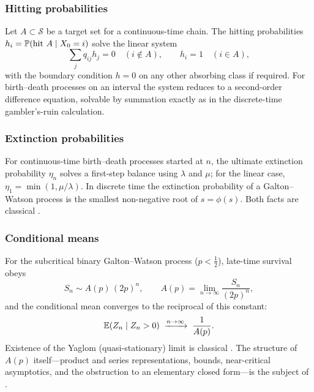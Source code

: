 \subsubsection*{Hitting probabilities}

Let $A\subset\mathcal S$ be a target set for a continuous-time chain. The hitting
probabilities $h_i=\mathbb{P}\!\left(\text{hit }A\mid X_0=i\right)$ solve the linear system
\begin{equation}
\label{m:eq:hitting}
\sum_j q_{ij}h_j = 0\quad(i\notin A),
\qquad h_i=1\quad(i\in A),
\end{equation}
with the boundary condition $h=0$ on any other absorbing class if required. For
birth--death processes on an interval the system reduces to a second-order difference
equation, solvable by summation exactly as in the discrete-time gambler's-ruin
calculation.

\subsubsection*{Extinction probabilities}

For continuous-time birth--death processes started at $n$, the ultimate extinction
probability $\eta_n$ solves a first-step balance using $\lambda$ and $\mu$; for the
linear case, $\eta_1=\min(1,\mu/\lambda)$. In discrete time the extinction probability
of a Galton--Watson process is the smallest non-negative root of $s=\phi(s)$. Both
facts are classical \cite{Athreya1972,Kendall1948}.

\subsubsection*{Conditional means}
\label{m:sec:condmeans}

For the subcritical binary Galton--Watson process ($p<\tfrac12$), late-time survival
obeys
\begin{equation}
\label{m:eq:lateS}
S_n \sim A(p)\,(2p)^n,
\qquad
A(p)=\lim_{n\to\infty}\frac{S_n}{(2p)^n},
\end{equation}
and the conditional mean converges to the reciprocal of this constant:
\begin{equation}
\label{m:eq:qsmean}
\mathbb{E}\!\left(Z_n\mid Z_n>0\right)\;\xrightarrow{n\to\infty}\;\frac{1}{A(p)}.
\end{equation}
Existence of the Yaglom (quasi-stationary) limit is classical
\cite{Yaglom1947,Meleard2012,Collet2013}. The structure of $A(p)$ itself---product and
series representations, bounds, near-critical asymptotics, and the obstruction to an
elementary closed form---is the subject of \ChA.

